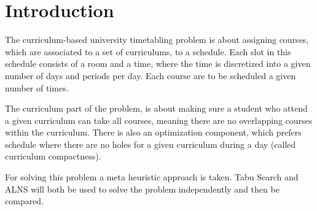 \section{Introduction}

The curriculum-based university timetabling problem is about assigning courses, which are associated to a set of curriculums, to a schedule. Each slot in this schedule consists of a room and a time, where the time is discretized into a given number of days and periods per day. Each course are to be scheduled a given number of times.

The curriculum part of the problem, is about making sure a student who attend a given curriculum can take all courses, meaning there are no overlapping courses within the  curriculum. There is also an optimization component, which prefers schedule where there are no holes for a given curriculum during a day (called curriculum compactness).

For solving this problem a meta heuristic approach is taken. Tabu Search and ALNS will both be used to solve the problem independently and then be compared.